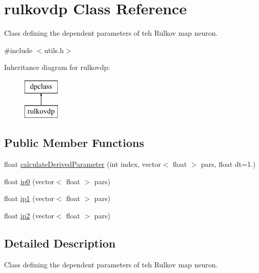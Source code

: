 \hypertarget{classrulkovdp}{\section{rulkovdp Class Reference}
\label{classrulkovdp}
}


Class defining the dependent parameters of teh Rulkov map neuron.  




{\ttfamily \#include $<$utils.\+h$>$}

Inheritance diagram for rulkovdp\+:\begin{figure}[H]
\begin{center}
\leavevmode
\includegraphics[height=2.000000cm]{d6/d9e/classrulkovdp}
\end{center}
\end{figure}
\subsection*{Public Member Functions}
\begin{DoxyCompactItemize}
\item 
float \hyperlink{classrulkovdp_ac05fee8df961da95972c7343e677660e}{calculate\+Derived\+Parameter} (int index, vector$<$ float $>$ pars, float dt=1.)
\item 
float \hyperlink{classrulkovdp_ab5acc4cf3debc79b90c4deeb882853ef}{ip0} (vector$<$ float $>$ pars)
\item 
float \hyperlink{classrulkovdp_a17547ab749f415b453fda7585317df32}{ip1} (vector$<$ float $>$ pars)
\item 
float \hyperlink{classrulkovdp_a9a264ffaa444a7182027a4242f1d8873}{ip2} (vector$<$ float $>$ pars)
\end{DoxyCompactItemize}


\subsection{Detailed Description}
Class defining the dependent parameters of teh Rulkov map neuron. 

